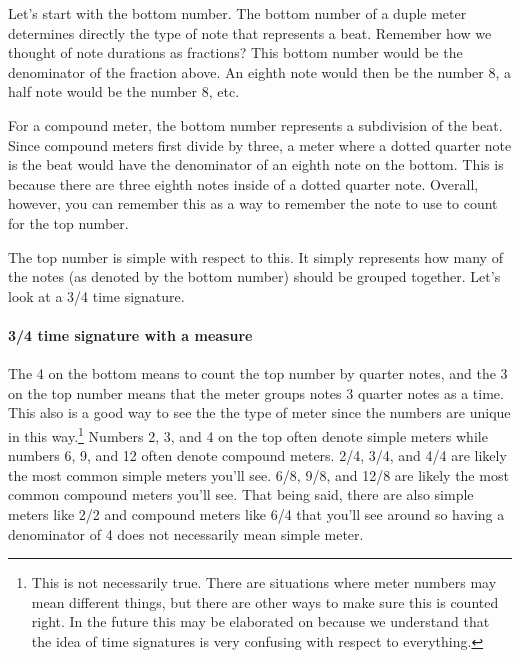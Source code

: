 \documentclass[../OpenAppliedMusicTheory.tex]{subfiles}
\begin{document}
        Let's start with the bottom number. The bottom number of a duple meter determines directly the type of note that represents a beat. Remember how we thought of note durations as fractions? This bottom number would be the denominator of the fraction above. An eighth note would then be the number 8, a half note would be the number 8, etc. 

        For a compound meter, the bottom number represents a  subdivision of the beat. Since compound meters first divide by three, %
        a meter where a dotted quarter note is the beat would have the denominator of an eighth note on the bottom. This is because there are three eighth notes inside of a dotted quarter note. Overall, however, you can remember this as a way to remember the note to use to count for the top number. %

        The top number is simple with respect to this. It simply represents how many of the notes (as denoted by the bottom number) should be grouped together. Let's look at a 3/4 time signature.
        
        \paragraph{3/4 time signature with a measure}
        
        The 4 on the bottom means to count the top number by quarter notes, and the 3 on the top number means that the meter groups notes 3 quarter notes as a time. This also is a good way to see the the type of meter since the numbers are unique in this way.\footnote{This is not necessarily true. There are situations where meter numbers may mean different things, but there are other ways to make sure this is counted right. In the future this may be elaborated on because we understand that the idea of time signatures is very confusing with respect to everything.} Numbers 2, 3, and 4 on the top often denote simple meters while numbers 6, 9, and 12 often denote compound meters. 2/4, 3/4, and 4/4 are likely the most common simple meters you'll see. 6/8, 9/8, and 12/8 are likely the most common compound meters you'll see. That being said, there are also simple meters like 2/2 and compound meters like 6/4 that you'll see around so having a denominator of 4 does not necessarily mean simple meter. 
\end{document}
